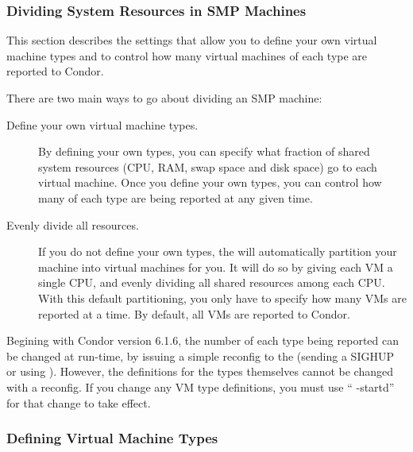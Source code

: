 \subsubsection{\label{sec:SMP-Divide}
Dividing System Resources in SMP Machines}

This section describes the settings that allow you to define your own
virtual machine types and to control how many virtual machines of each
type are reported to Condor.

There are two main ways to go about dividing an SMP machine:

\begin{description}

\item[Define your own virtual machine types.]
  By defining your own types, you can specify what fraction of shared
  system resources (CPU, RAM, swap space and disk space) go to each
  virtual machine.
  Once you define your own types, you can control how many of each
  type are being reported at any given time.

\item[Evenly divide all resources.]  
  If you do not define your own types, the  will
  automatically	partition your machine into virtual machines for you.
  It will do so by giving each VM a single CPU, and evenly dividing
  all shared resources among each CPU.
  With this default partitioning, you only have to specify how many
  VMs are reported at a time.
  By default, all VMs are reported to Condor.

\end{description}

Begining with Condor version 6.1.6, the number of each type being
reported can be changed at run-time, by issuing a simple reconfig to
the  (sending a SIGHUP or using ).
However, the definitions for the types themselves cannot be changed
with a reconfig.
If you change any VM type definitions, you must use ``
-startd'' for that change to take effect.

\subsubsection{\label{sec:VM-Type-Define}
Defining Virtual Machine Types}

